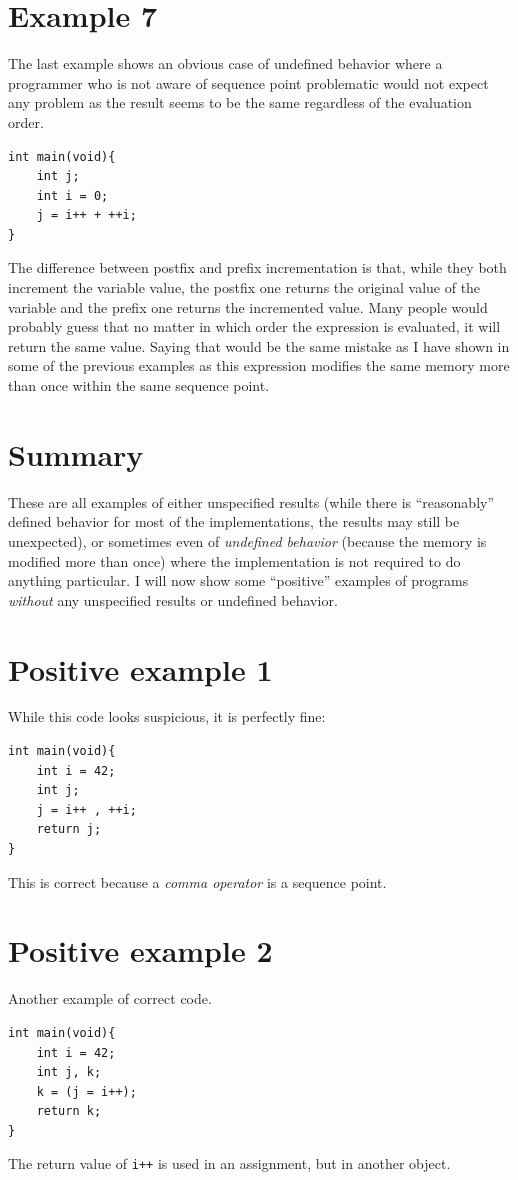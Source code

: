\section{Example 7}\label{example7}
The last example shows an obvious case of undefined behavior where a programmer who is not aware of sequence point problematic would not expect any problem as the result seems to be the same regardless of the evaluation order.
\begin{lstlisting}
int main(void){
    int j;
    int i = 0;
    j = i++ + ++i;
}
\end{lstlisting}
The difference between postfix and prefix incrementation is that, while they both increment the variable value, the postfix one returns the original value of the variable and the prefix one returns the incremented value. Many people would probably guess that no matter in which order the expression is evaluated, it will return the same value. Saying that would be the same mistake as I have shown in some of the previous examples as this expression modifies the same memory more than once within the same sequence point.

\section{Summary}
These are all examples of either unspecified results (while there is ``reasonably'' defined behavior for most of the implementations, the results may still be unexpected), or sometimes even of \emph{undefined behavior} (because the memory is modified more than once) where the implementation is not required to do anything particular. I will now show some ``positive'' examples of programs \emph{without} any unspecified results or undefined behavior.

\section{Positive example 1}
While this code looks suspicious, it is perfectly fine:
\begin{lstlisting}
int main(void){
    int i = 42;
    int j;
    j = i++ , ++i;
    return j;
}
\end{lstlisting}
This is correct because a \emph{comma operator} is a sequence point.

\section{Positive example 2}
Another example of correct code.
\begin{lstlisting}
int main(void){
    int i = 42;
    int j, k;
    k = (j = i++);
    return k;
}
\end{lstlisting}
The return value of \verb|i++| is used in an assignment, but in another object.


